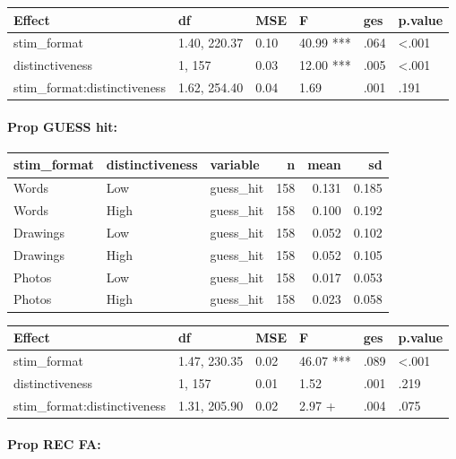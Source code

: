 \documentclass[
  11pt,
]{article}
\begin{document}
\begin{tabular}{l|l|l|l|l|l}
\hline
Effect & df & MSE & F & ges & p.value\\
\hline
stim\_format & 1.40, 220.37 & 0.10 & 40.99 *** & .064 & <.001\\
\hline
distinctiveness & 1, 157 & 0.03 & 12.00 *** & .005 & <.001\\
\hline
stim\_format:distinctiveness & 1.62, 254.40 & 0.04 & 1.69 & .001 & .191\\
\hline
\end{tabular}

\newpage

\hypertarget{prop-guess-hit}{%
\paragraph{Prop GUESS hit:}\label{prop-guess-hit}}

\begin{table}[!h]
\centering
\begin{tabular}{lllrrr}
\toprule
stim\_format & distinctiveness & variable & n & mean & sd\\
\midrule
Words & Low & guess\_hit & 158 & 0.131 & 0.185\\
Words & High & guess\_hit & 158 & 0.100 & 0.192\\
Drawings & Low & guess\_hit & 158 & 0.052 & 0.102\\
Drawings & High & guess\_hit & 158 & 0.052 & 0.105\\
Photos & Low & guess\_hit & 158 & 0.017 & 0.053\\
\addlinespace
Photos & High & guess\_hit & 158 & 0.023 & 0.058\\
\bottomrule
\end{tabular}
\end{table}

\begin{tabular}{l|l|l|l|l|l}
\hline
Effect & df & MSE & F & ges & p.value\\
\hline
stim\_format & 1.47, 230.35 & 0.02 & 46.07 *** & .089 & <.001\\
\hline
distinctiveness & 1, 157 & 0.01 & 1.52 & .001 & .219\\
\hline
stim\_format:distinctiveness & 1.31, 205.90 & 0.02 & 2.97 + & .004 & .075\\
\hline
\end{tabular}

\newpage

\hypertarget{prop-rec-fa}{%
\paragraph{Prop REC FA:}\label{prop-rec-fa}}
\end{document}

